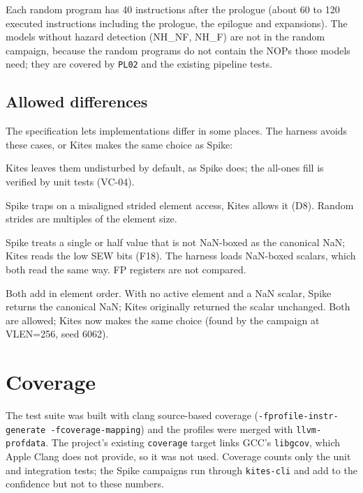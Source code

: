 \documentclass[11pt]{article}
\begin{document}
Each random program has 40 instructions after the prologue (about 60 to 120 executed
instructions including the prologue, the epilogue and expansions). The models without hazard
detection (NH\_NF, NH\_F) are not in the random campaign, because the random programs do not
contain the NOPs those models need; they are covered by \texttt{PL02} and the existing pipeline
tests.

\subsection{Allowed differences}\label{sec:spike-diff}

The specification lets implementations differ in some places. The harness avoids these cases,
or Kites makes the same choice as Spike:

\begin{description}[style=nextline,leftmargin=0.6cm,font=\sffamily\bfseries\color{kblue}]
\item[Agnostic elements] Kites leaves them undisturbed by default, as Spike does; the all-ones
  fill is verified by unit tests (VC-04).
\item[Misaligned element accesses] Spike traps on a misaligned strided element access, Kites
  allows it (D8). Random strides are multiples of the element size.
\item[NaN-boxing] Spike treats a single or half value that is not NaN-boxed as the canonical NaN;
  Kites reads the low SEW bits (F18). The harness loads NaN-boxed scalars, which both read the
  same way. FP registers are not compared.
\item[Unordered sums] Both add in element order. With no active element and a NaN scalar,
  Spike returns the canonical NaN; Kites originally returned the scalar unchanged. Both are
  allowed; Kites now makes the same choice (found by the campaign at VLEN=256, seed 6062).
\end{description}

\section{Coverage}\label{sec:coverage}

The test suite was built with clang source-based coverage (\texttt{-fprofile-instr-generate
-fcoverage-mapping}) and the profiles were merged with \texttt{llvm-profdata}. The project's
existing \texttt{coverage} target links GCC's \texttt{libgcov}, which Apple Clang does not
provide, so it was not used. Coverage counts only the unit and integration tests; the Spike
campaigns run through \texttt{kites-cli} and add to the confidence but not to these numbers.
\end{document}
